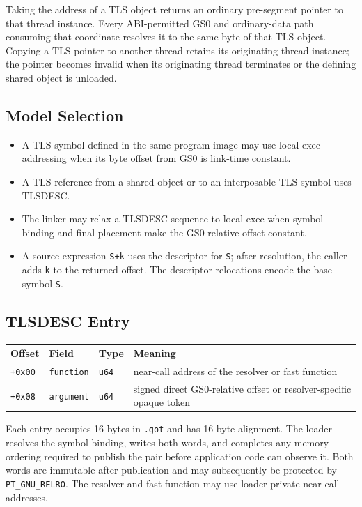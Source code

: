 \documentclass[10pt,twoside]{article}
\begin{document}


Taking the address of a TLS object returns an ordinary pre-segment pointer to
that thread instance. Every ABI-permitted GS0 and ordinary-data path consuming
that coordinate resolves it to the same byte of that TLS object. Copying a TLS pointer to
another thread retains its originating thread instance; the pointer becomes invalid when its
originating thread terminates or the defining shared object is unloaded.
\subsection{Model Selection}
\begin{itemize}
\item A TLS symbol defined in the same program image may use local-exec addressing when its byte offset from GS0 is link-time constant.
\item A TLS reference from a shared object or to an interposable TLS symbol uses TLSDESC.
\item The linker may relax a TLSDESC sequence to local-exec when symbol binding and final placement make the GS0-relative offset constant.
\item A source expression \texttt{S+k} uses the descriptor for \texttt{S}; after resolution, the caller adds \texttt{k} to the returned offset. The descriptor relocations encode the base symbol \texttt{S}.
\end{itemize}
\Needspace{1.8in}
\subsection{TLSDESC Entry}
\begingroup\footnotesize
\setlength{\tabcolsep}{2pt}
\begin{longtable}{@{}p{0.8in}p{1.7in}p{0.65in}p{2.35in}@{}}
\toprule
\textbf{Offset} & \textbf{Field} & \textbf{Type} & \textbf{Meaning}\\
\midrule
\endhead
\texttt{+0x00} & \texttt{function} & \texttt{u64} & near-call address of the resolver or fast function\\
\texttt{+0x08} & \texttt{argument} & \texttt{u64} & signed direct GS0-relative offset or resolver-specific opaque token\\
\bottomrule
\end{longtable}
\endgroup

Each entry occupies 16 bytes in \texttt{.got} and has 16-byte alignment. The
loader resolves the symbol binding, writes both words, and completes any memory
ordering required to publish the pair before application code can observe it.
Both words are immutable after publication and may subsequently be protected by
\texttt{PT\_GNU\_RELRO}. The resolver and fast function may use loader-private
near-call addresses.
\end{document}
